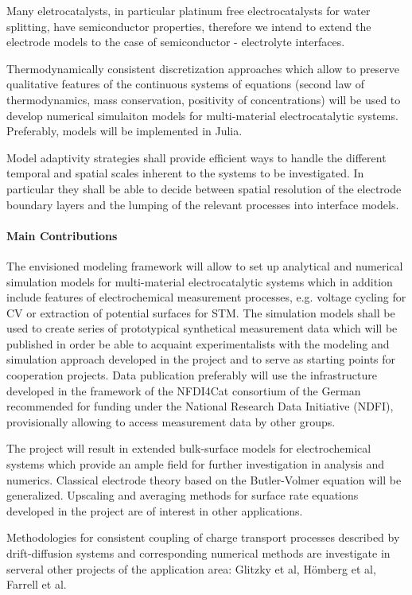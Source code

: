 \documentclass[a4paper,10pt]{article}
\begin{document}
Many eletrocatalysts, in particular platinum free electrocatalysts for water splitting, have semiconductor properties, therefore we intend to extend the electrode models to the case of semiconductor - electrolyte interfaces.

Thermodynamically consistent discretization approaches which allow to preserve qualitative features of the continuous systems of equations  (second law of thermodynamics, mass conservation, positivity of concentrations) will be used to  develop numerical simulaiton models for multi-material electrocatalytic systems.  Preferably, models will be implemented in  Julia.

Model adaptivity strategies shall provide efficient ways to handle the different temporal and spatial scales inherent to the systems to be investigated. In particular they shall be able to decide between spatial resolution of the electrode boundary layers and the lumping of the relevant processes into interface models.


\paragraph{Main Contributions}
The envisioned modeling framework will allow to set up analytical and numerical simulation models for multi-material electrocatalytic systems  which in addition include features of electrochemical measurement processes, e.g. voltage cycling for CV or extraction of potential surfaces for STM.
The simulation  models shall be used to create series of prototypical synthetical measurement data which will be published in order be able to acquaint experimentalists with the modeling and simulation approach developed in the project and to serve as starting points for cooperation projects. Data publication preferably will  use the infrastructure developed in the framework of the NFDI4Cat consortium of the German recommended for funding under the National Research Data Initiative (NDFI), provisionally allowing to access measurement data by other groups.

The project will result in extended bulk-surface models for electrochemical systems which provide an ample field for further investigation in analysis and numerics. 
Classical electrode theory based on the Butler-Volmer equation will be generalized.  Upscaling and averaging methods for surface rate equations developed in the project are of interest in other applications.

Methodologies for consistent coupling of charge transport processes described by drift-diffusion systems and
corresponding numerical methods are investigate  in serveral other projects of the application area: Glitzky et al, Hömberg et al, Farrell et al.
\end{document}
